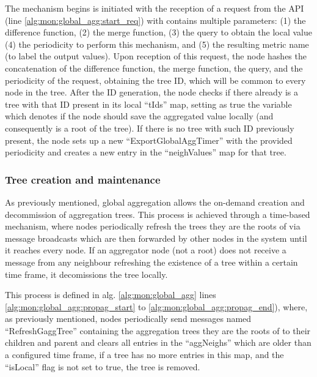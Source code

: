 The mechanism begins is initiated with the reception of a request from the API (line \ref{alg:mon:global_agg:start_req}) with contains multiple parameters: (1) the difference function, (2) the merge function,  (3) the query to obtain the local value (4) the periodicity to perform this mechanism, and (5) the resulting metric name (to label the output values). Upon reception of this request, the node hashes the concatenation of the difference function, the merge function, the query, and the periodicity of the request, obtaining the tree ID, which will be common to every node in the tree. After the ID generation, the node checks if there already is a tree with that ID present in its local ``tIds'' map, setting as true the variable which denotes if the node should save the aggregated value locally (and consequently is a root of the tree). If there is no tree with such ID previously present, the node sets up a new ``ExportGlobalAggTimer'' with the provided periodicity and creates a new entry in the ``neighValues'' map for that tree.

\subsubsection{Tree creation and maintenance}

As previously mentioned, global aggregation allows the on-demand creation and decommission of aggregation trees. This process is achieved through a time-based mechanism, where nodes periodically refresh the trees they are the roots of via message broadcasts which are then forwarded by other nodes in the system until it reaches every node. If an aggregator node (not a root) does not receive a message from any neighbour refreshing the existence of a tree within a certain time frame, it decomissions the tree locally. 

This process is defined in alg. \ref{alg:mon:global_agg} lines \ref{alg:mon:global_agg:propag_start} to \ref{alg:mon:global_agg:propag_end}), where, as previously mentioned, nodes periodically send messages named ``RefreshGaggTree'' containing the aggregation trees they are the roots of to their children and parent and clears all entries in the ``aggNeighs'' which are older than a configured time frame, if a tree has no more entries in this map, and the ``isLocal'' flag is not set to true, the tree is removed.


